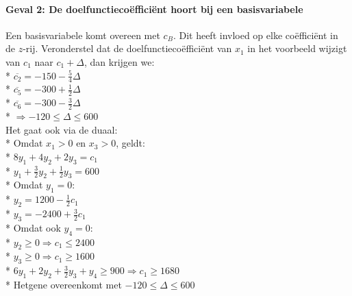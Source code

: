 \documentclass[10pt]{article}
\begin{document}
\paragraph{Geval 2: De doelfunctieco\"effici\"ent hoort bij een basisvariabele}
Een basisvariabele komt overeen met $c_B$. Dit heeft invloed op elke co\"effici\"ent in de $z$-rij. Veronderstel dat de doelfunctieco\"effici\"ent van $x_1$ in het voorbeeld wijzigt van $c_1$ naar $c_1 + \Delta$, dan krijgen we:\\*
$\overline{c_2} = -150-\frac{5}{4}\Delta$\\*
$\overline{c_5} = -300+\frac{1}{2}\Delta$\\*
$\overline{c_6} = -300-\frac{3}{2}\Delta$\\*
$\Rightarrow -120 \le \Delta \le 600$\\
Het gaat ook via de duaal:\\*
Omdat $x_1 > 0$ en $x_3 > 0$, geldt:\\*
$8y_1 + 4y_2 + 2y_3 = c_1$\\*
$y_1 + \frac{3}{2}y_2 + \frac{1}{2}y_3 = 600$\\*
Omdat $y_1 = 0$:\\*
$y_2 = 1200 - \frac{1}{2}c_1$\\*
$y_3 = -2400 + \frac{3}{2}c_1$\\*
Omdat ook $y_4 = 0$:\\*
$y_2 \ge 0 \Rightarrow c_1 \le 2400$\\*
$y_3 \ge 0 \Rightarrow c_1 \ge 1600$\\*
$6y_1 + 2y_2 + \frac{3}{2}y_3 + y_4 \ge 900 \Rightarrow c_1 \ge 1680$\\*
Hetgene overeenkomt met $-120 \le \Delta \le 600$
\end{document}
